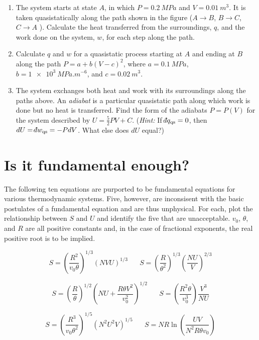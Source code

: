 \documentclass[11pt]{article}
\def\dbar{{\mathchar'26\mkern-12mu d}}
\begin{document}
\begin{enumerate}
\item The system starts at state \(A\), in which \(P= \SI{0.2}{MPa}\) and \(V = \SI{0.01}{m^{3}}\). It is taken quasistatically along the path shown in the figure (\(A \rightarrow B\), \(B \rightarrow C\), \(C \rightarrow A\) ).  Calculate the heat transferred from the surroundings, \(q\), and the work done on the system, \(w\), for each step along the path.

\item Calculate \(q\) and \(w\) for a quasistatic process starting at \(A\) and ending at \(B\) along the path \(P=a + b(V-c)^{2}\), where \(a = \SI{0.1}{MPa}\), \(b= \SI{1e3}{MPa. m^{-6}}\), and \(c = \SI{0.02}{m^{3}}\).

\item The system exchanges both heat and work with its surroundings along the paths above. An \emph{adiabat} is a particular quasistatic path along which work is done but no heat is transferred.  Find the form of the adiabats \(P=P(V)\) for the system described by \(U = \frac{5}{2} PV +C\).  (\emph{Hint:} If \(\dbar q_\text{qs} = 0\), then \(dU = \dbar w_\text{qs} = -PdV\).  What else does \(dU\) equal?)
\end{enumerate}

\section{Is it fundamental enough?}
\label{sec:orgae1740c}
The following ten equations are purported to be fundamental equations for
various thermodynamic systems.  Five, however, are inconsisent with the basic
  postulates of a fundamental equation and are thus unphysical.  For each, plot
  the relationship between \(S\) and \(U\) and identify the five that are
  unacceptable. \(v_0\), \(\theta\), and \(R\) are all positive constants and, in the
  case of fractional exponents, the real positive root is to be implied.

\[ S = \left ( \frac{R^2}{v_0\theta} \right )^{1/3}\left ( NVU \right
)^{1/3}\hspace{20pt}
S = \left ( \frac{R}{\theta^2} \right )^{1/3}\left ( \frac{NU}{V} \right)^{2/3} \]

\[ S = \left ( \frac{R}{\theta} \right )^{1/2}\left ( NU + \frac{R\theta
    V^2}{v_0^2} \right)^{1/2}
\hspace{20pt}
S = \left ( \frac{R^2\theta}{v_0^3} \right ) \frac{V^3}{NU}  \]

\[ S = \left ( \frac{R^3}{v_0\theta^2} \right )^{1/5}\left ( N^2U^2V
 \right)^{1/5}
\hspace{20pt}
S = NR \ln \left ( \frac{UV}{N^2 R \theta v_0}  \right )  \]
\end{document}
